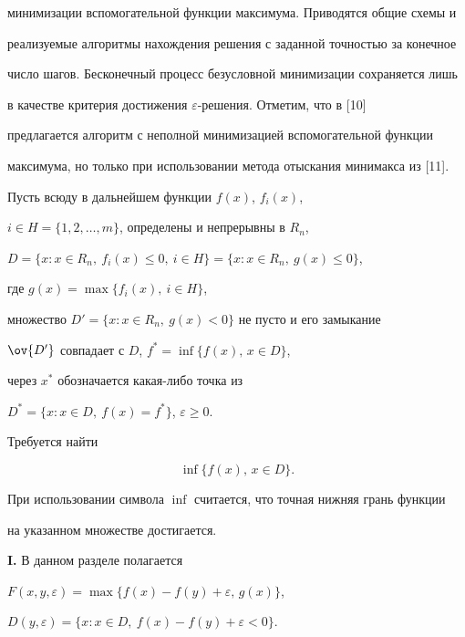минимизации вспомогательной функции максимума. Приводятся общие схемы и 


реализуемые алгоритмы нахождения решения с заданной точностью за конечное


число шагов. Бесконечный процесс безусловной минимизации сохраняется лишь


в качестве критерия достижения $\varepsilon$-решения. Отметим, что в [10]


предлагается алгоритм с неполной минимизацией вспомогательной функции


максимума, но только при использовании метода отыскания минимакса из [11].





Пусть всюду в дальнейшем функции $f(x)$, $f_i(x)$,


$i\in H=\{1,2,\dotsc,m\}$, определены и непрерывны в $R_n$,


$D=\{x:x\in R_n,\ f_i(x)\le0,\ i\in H\}=\{x:x\in R_n,\ g(x)\le0\}$, 


где $g(x)=\max\{f_i(x),\ i\in H\}$,


множество $D'=\{x:x\in R_n,\ g(x)<0\}$ не пусто и его замыкание


$\ov{D'}$ совпадает с $D$, $f^*=\inf\{f(x),\,x\in D\}$,


через $x^*$ обозначается какая-либо точка из


$D^*=\{x:x\in D,\ f(x)=f^*\}$, $\varepsilon{\ge}0$.


Требуется найти


\begin{equation}


\inf\{f(x),\,x\in D\}.


\end{equation}





При использовании символа $\inf$ считается, что точная нижняя грань функции


на указанном множестве достигается. 


\medskip





{\bf I.} В данном разделе полагается


$F(x,y,\varepsilon)=\max\{f(x)-f(y)+\varepsilon,\,g(x)\}$,


$D(y,\varepsilon)=\{x:x\in D,\ f(x)-f(y)+\varepsilon<0\}$.






